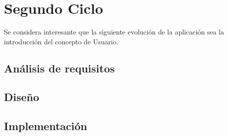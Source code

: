 \section{Segundo Ciclo} %
\label{sec:secundo_ciclo}

Se considera interesante que la siguiente evolución de la aplicación sea la introducción del concepto de Usuario.

\subsection{Análisis de requisitos} %
\label{sub:análisis_de_requisitos}




\subsection{Diseño} %
\label{sub:diseño}


\subsection{Implementación} %
\label{sub:implementación}


